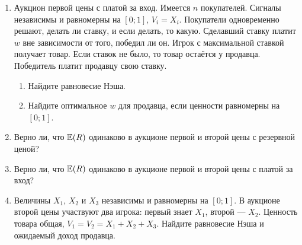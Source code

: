 \begin{enumerate}
\item Аукцион первой цены с платой за вход. Имеется $ n $ покупателей.  Сигналы независимы и равномерны на $ [0;1] $, $ V_{i}=X_{i} $. Покупатели одновременно решают, делать ли ставку, и если делать, то какую. Сделавший ставку платит $ w $ вне зависимости от того, победил ли он. Игрок с максимальной ставкой получает товар. Если ставок не было, то товар остаётся у продавца. Победитель платит продавцу свою ставку.
\begin{enumerate}
\item Найдите равновесие Нэша.
\item Найдите оптимальное $ w $ для продавца, если ценности равномерны на $ [0;1] $.
\end{enumerate}

\item Верно ли, что $ \operatorname{\mathbb{E}}(R) $ одинаково в аукционе первой и второй цены с резервной ценой?

\item Верно ли, что $ \operatorname{\mathbb{E}}(R) $ одинаково в аукционе первой и второй цены с платой за вход?

\item Величины $ X_{1} $, $ X_{2} $ и $ X_{3} $ независимы и равномерны на $ [0;1] $. В аукционе второй цены участвуют два игрока: первый знает $ X_{1} $, второй — $ X_{2} $. Ценность товара общая, $ V_{1}=V_{2}=X_{1}+X_{2}+X_{3} $. Найдите равновесие Нэша и ожидаемый доход продавца.


\end{enumerate}
